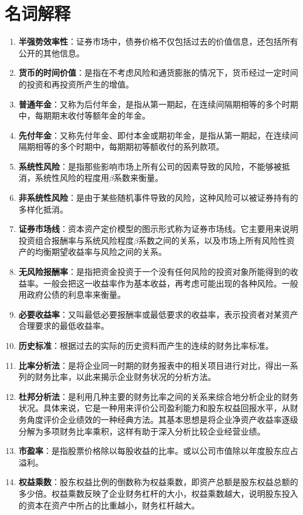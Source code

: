 \documentclass[
  10pt,
  twoside,
  openany,
  b5paper, %
  colorscheme = black, %
  xits = false,
]{qyxf-book}
\begin{document}
\section{名词解释}
\begin{enumerate}
	\item \textbf{半强势效率性}：证券市场中，债券价格不仅包括过去的价值信息，还包括所有公开的其他信息。
	\item \textbf{货币的时间价值}：是指在不考虑风险和通货膨胀的情况下，货币经过一定时间的投资和再投资所产生的增值。
	\item \textbf{普通年金}：又称为后付年金，是指从第一期起，在连续间隔期相等的多个时期中，每期期末收付等额年金的年金。
	\item \textbf{先付年金}：又称先付年金、即付本金或期初年金，是指从第一期起，在连续间隔期相等的多个时期中，每期期初等额收付的系列款项。
	\item \textbf{系统性风险}：是指那些影响市场上所有公司的因素导致的风险，不能够被抵消，系统性风险的程度用$\beta$系数来衡量。
	\item \textbf{非系统性风险}：是由于某些随机事件导致的风险，这种风险可以被证券持有的多样化抵消。
	\item \textbf{证券市场线}：资本资产定价模型的图示形式称为证券市场线。它主要用来说明投资组合报酬率与系统风险程度$\beta$系数之间的关系，以及市场上所有风险性资产的均衡期望收益率与风险之间的关系。
	\item \textbf{无风险报酬率}：是指把资金投资于一个没有任何风险的投资对象所能得到的收益率。一般会把这一收益率作为基本收益，再考虑可能出现的各种风险。一般用政府公债的利息率来衡量。
	\item \textbf{必要收益率}：又叫最低必要报酬率或最低要求的收益率，表示投资者对某资产合理要求的最低收益率。
	\item \textbf{历史标准}：根据过去的实际的历史资料而产生的连续的财务比率标准。
	\item \textbf{比率分析法}：是将企业同一时期的财务报表中的相关项目进行对比，得出一系列的财务比率，以此来揭示企业财务状况的分析方法。
	\item \textbf{杜邦分析法}：是利用几种主要的财务比率之间的关系来综合地分析企业的财务状况。具体来说，它是一种用来评价公司盈利能力和股东权益回报水平，从财务角度评价企业绩效的一种经典方法。其基本思想是将企业净资产收益率逐级分解为多项财务比率乘积，这样有助于深入分析比较企业经营业绩。
	\item \textbf{市盈率}：是指股票价格除以每股收益的比率。或以公司市值除以年度股东应占溢利。
	\item \textbf{权益乘数}：股东权益比例的倒数称为权益乘数，即资产总额是股东权益总额的多少倍。权益乘数反映了企业财务杠杆的大小，权益乘数越大，说明股东投入的资本在资产中所占的比重越小，财务杠杆越大。

\end{enumerate}
\end{document}
